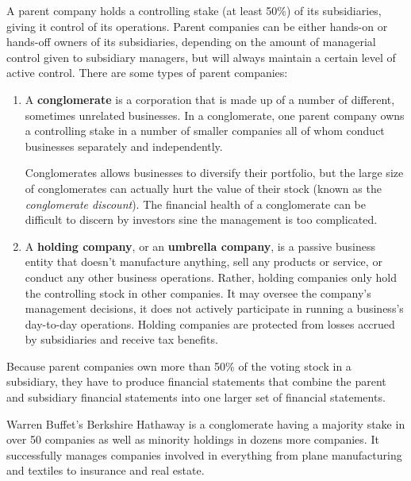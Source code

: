 \documentclass{article}
\begin{document}
    \begin{definition}
      \label{def:parent-company}
      A parent company holds a controlling stake (at least 50\%) of its subsidiaries, giving it control of its operations. Parent companies can be either hands-on or hands-off owners of its subsidiaries, depending on the amount of managerial control given to subsidiary managers, but will always maintain a certain level of active control. There are some types of parent companies:
      \begin{enumerate}
        \item A \textbf{conglomerate} is a corporation that is made up of a number of different, sometimes unrelated businesses. In a conglomerate, one parent company owns a controlling stake in a number of smaller companies all of whom conduct businesses separately and independently. 
        
        Conglomerates allows businesses to diversify their portfolio, but the large size of conglomerates can actually hurt the value of their stock (known as the \textit{conglomerate discount}). The financial health of a conglomerate can be difficult to discern by investors sine the management is too complicated. 
        \item A \textbf{holding company}, or an \textbf{umbrella company}, is a passive business entity that doesn't manufacture anything, sell any products or service, or conduct any other business operations. Rather, holding companies only hold the controlling stock in other companies. It may oversee the company's management decisions, it does not actively participate in running a business's day-to-day operations. Holding companies are protected from losses accrued by subsidiaries and receive tax benefits.
      \end{enumerate}
      Because parent companies own more than 50\% of the voting stock in a subsidiary, they have to produce financial statements that combine the parent and subsidiary financial statements into one larger set of financial statements. 
    \end{definition}

    \begin{example}
      \label{ex:berkshire-hathaway}
      Warren Buffet's Berkshire Hathaway is a conglomerate having a majority stake in over 50 companies as well as minority holdings in dozens more companies. It successfully manages companies involved in everything from plane manufacturing and textiles to insurance and real estate. 
    \end{example}
\end{document}
